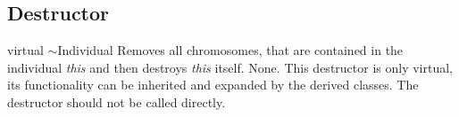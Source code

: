 \subsection{Destructor}

\printEmptyMethodReturnSpecial
{virtual}
{$\sim$Individual}
{Removes all chromosomes, that are contained in the individual {\em this}
 and then destroys {\em this} itself.}
{None.}
{This destructor is only virtual, its functionality can be inherited
 and expanded by the derived classes. The destructor should not
 be called directly.}
